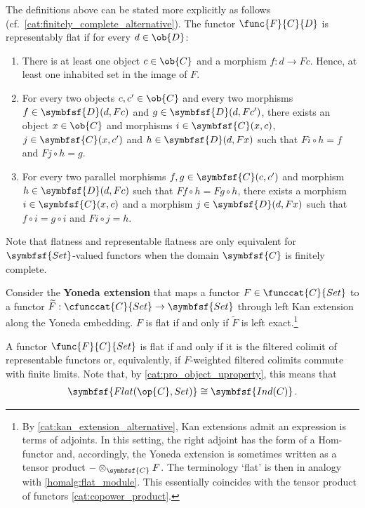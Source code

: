     The definitions above can be stated more explicitly as follows (cf.~\cref{cat:finitely_complete_alternative}). The functor $\func{F}{C}{D}$ is representably flat if for every $d\in\ob{D}$:
    \begin{enumerate}
        \item There is at least one object $c\in\ob{C}$ and a morphism $f:d\rightarrow Fc$. Hence, at least one inhabited set in the image of $F$.
        \item For every two objects $c,c'\in\ob{C}$ and every two morphisms $f\in\symbfsf{D}(d,Fc)$ and $g\in\symbfsf{D}(d,Fc')$, there exists an object $x\in\ob{C}$ and morphisms $i\in\symbfsf{C}(x,c)$, $j\in\symbfsf{C}(x,c')$ and $h\in\symbfsf{D}(d,Fx)$ such that $Fi\circ h=f$ and $Fj\circ h=g$.
        \item For every two parallel morphisms $f,g\in\symbfsf{C}(c,c')$ and morphism $h\in\symbfsf{D}(d,Fc)$ such that $Ff\circ h=Fg\circ h$, there exists a morphism $i\in\symbfsf{C}(x,c)$ and a morphism $j\in\symbfsf{D}(d,Fx)$ such that $f\circ i=g\circ i$ and $Fi\circ j=h$.
    \end{enumerate}

    \begin{remark}
        Note that flatness and representable flatness are only equivalent for $\symbfsf{Set}$-valued functors when the domain $\symbfsf{C}$ is finitely complete.
    \end{remark}

    \begin{property}
        Consider the \textbf{Yoneda extension} that maps a functor $F\in\funccat{C}{Set}$ to a functor $\widetilde{F}:\cfunccat{C}{Set}\rightarrow\symbfsf{Set}$ through left Kan extension along the Yoneda embedding. $F$ is flat if and only if $\widetilde{F}$ is left exact.\footnote{By \cref{cat:kan_extension_alternative}, Kan extensions admit an expression is terms of adjoints. In this setting, the right adjoint has the form of a Hom-functor and, accordingly, the Yoneda extension is sometimes written as a tensor product $-\otimes_{\symbfsf{C}}F$. The terminology `flat' is then in analogy with \cref{homalg:flat_module}. This essentially coincides with the tensor product of functors \cref{cat:copower_product}.}
    \end{property}
    \begin{property}\label{topos:flat_or_ind}
        A functor $\func{F}{C}{Set}$ is flat if and only if it is the filtered colimit of representable functors or, equivalently, if $F$-weighted filtered colimits commute with finite limits. Note that, by \cref{cat:pro_object_uproperty}, this means that
        \begin{gather}
            \symbfsf{Flat(\op{C},Set)}\cong\symbfsf{Ind(C)}\,.
        \end{gather}
    \end{property}

